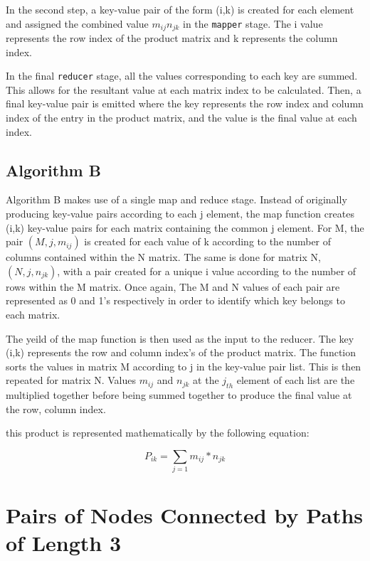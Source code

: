 \documentclass[10pt,twocolumn]{witseiepaper}
\begin{document}
In the second step, a key-value pair of the form (i,k) is created for each element and assigned the combined value $m_{ij}n_{jk}$ in the \texttt{mapper} stage. The i value represents the row index of the product matrix and k represents the column index. 

In the final \texttt{reducer} stage, all the values corresponding to each key are summed. This allows for the resultant value at each matrix index to be calculated. Then, a final key-value pair is emitted where the key represents the row index and column index of the entry in the product matrix, and the value is the final value at each index.

\subsection{Algorithm B}

Algorithm B makes use of a single map and reduce stage. Instead of originally producing key-value pairs according to each j element, the map function creates (i,k) key-value pairs for each matrix containing the common j element. For M, the pair  $(M, j, m_{ij})$ is created for each value of k according to the number of columns contained within the N matrix. The same is done for matrix N, $(N, j,n_{jk})$, with a pair created for a unique i value according to the number of rows within the M matrix. Once again, The M and N values of each pair are represented as 0 and 1's respectively in order to identify which key belongs to each matrix.
	
The yeild of the map function is then used as the input to the reducer. The key (i,k) represents the row and column index's of the product matrix. The function sorts the values in matrix M according to j in the key-value pair list. This is then repeated for matrix N. Values $m_{ij}$ and $n_{jk}$ at the $j_{th}$ element of each list are the multiplied together before being summed together to produce the final value at the row, column index. 

this product is represented mathematically by the following equation:

 \begin{equation}
P_{ik}= \sum _{j = 1} m_{ij} * n_{jk}
\label{eqn:multiply}
\end{equation}

\section{Pairs of Nodes Connected by Paths of Length 3}
\end{document}
